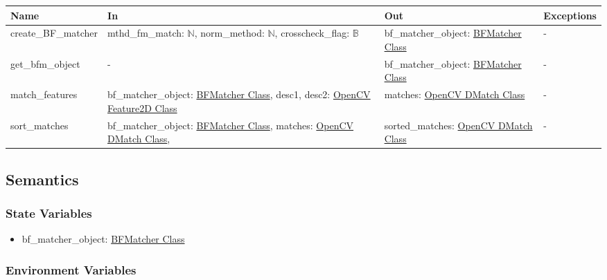 \documentclass[12pt, titlepage]{article}
\begin{document}
\begin{center}
\begin{tabular}{p{3.5cm} p{4cm} p{3.5cm} p{2.5cm}}
\hline
\textbf{Name} & \textbf{In} & \textbf{Out} & \textbf{Exceptions} \\
\hline
create\_BF\_matcher 
& mthd\_fm\_match: $\mathbb{N}$, \newline
norm\_method: $\mathbb{N}$, \newline
crosscheck\_flag: $\mathbb{B}$ 
& bf\_matcher\_object: \href{https://docs.opencv.org/3.4/d3/da1/classcv_1_1BFMatcher.html}{BFMatcher Class} 
& - \\
\hline
get\_bfm\_object 
& -
& bf\_matcher\_object: \href{https://docs.opencv.org/3.4/d3/da1/classcv_1_1BFMatcher.html}{BFMatcher Class} 
& - \\
\hline
match\_features 
& bf\_matcher\_object: \href{https://docs.opencv.org/3.4/d3/da1/classcv_1_1BFMatcher.html}{BFMatcher Class}, \newline
desc1, desc2: \href{https://docs.opencv.org/4.x/d0/d13/classcv_1_1Feature2D.html}{OpenCV Feature2D Class}
& matches: \href{https://docs.opencv.org/3.4/d4/de0/classcv_1_1DMatch.html}{OpenCV DMatch Class} 
& - \\
\hline
sort\_matches & bf\_matcher\_object: \href{https://docs.opencv.org/3.4/d3/da1/classcv_1_1BFMatcher.html}{BFMatcher Class}, \newline 
matches: \href{https://docs.opencv.org/3.4/d4/de0/classcv_1_1DMatch.html}{OpenCV DMatch Class}, \newline 
& sorted\_matches: \href{https://docs.opencv.org/3.4/d4/de0/classcv_1_1DMatch.html}{OpenCV DMatch Class}
& - \\
\hline
\end{tabular}
\end{center}

\subsection{Semantics}

\subsubsection{State Variables}
\begin{itemize}
  \item bf\_matcher\_object: \href{https://docs.opencv.org/3.4/d3/da1/classcv_1_1BFMatcher.html}{BFMatcher Class}
\end{itemize}
\subsubsection{Environment Variables}
\end{document}
